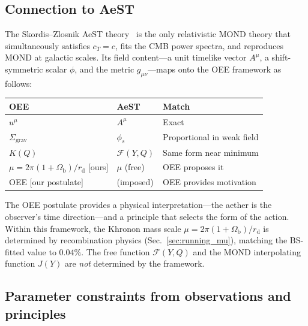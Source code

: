 \documentclass[prd,twocolumn,superscriptaddress,longbibliography,floatfix]{revtex4-2}
\newcommand{\Sgrav}{\Sigma_{\mathrm{grav}}}
\begin{document}
\subsection{Connection to AeST}

The Skordis--Zlosnik AeST theory~\cite{SkordisZlosnik2021}
is the only relativistic MOND theory that simultaneously
satisfies $c_T = c$, fits the CMB power spectra, and
reproduces MOND at galactic scales.  Its field content---a
unit timelike vector $A^\mu$, a shift-symmetric scalar
$\phi$, and the metric $g_{\mu\nu}$---maps onto the
OEE framework as follows:
\begin{center}
\begin{tabular}{lll}
\textbf{OEE} & \textbf{AeST} & \textbf{Match} \\
\hline
$u^\mu$ & $A^\mu$ & Exact \\
$\Sgrav$ & $\phi_s$ & Proportional in weak field \\
$K(Q)$ & $\mathcal{F}(Y,Q)$ & Same form near minimum \\
$\mu = 2\pi(1\!+\!\Omega_{\mathrm{b}})/r_{\mathrm{d}}$ [ours] & $\mu$ (free) & OEE proposes it \\
OEE [our postulate] & (imposed) & OEE provides motivation \\
\end{tabular}
\end{center}

The OEE postulate provides a physical interpretation---the
aether is the observer's time direction---and a principle
that selects the form of the action.  Within this
framework, the Khronon mass scale
$\mu = 2\pi(1+\Omega_{\mathrm{b}})/r_{\mathrm{d}}$
is determined by recombination physics
(Sec.~\ref{sec:running_mu}), matching the BS-fitted
value to $0.04\%$.  The free function
$\mathcal{F}(Y,Q)$ and the MOND interpolating function
$J(Y)$ are \emph{not} determined by the framework.

\subsection{Parameter constraints from observations and principles}
\end{document}
